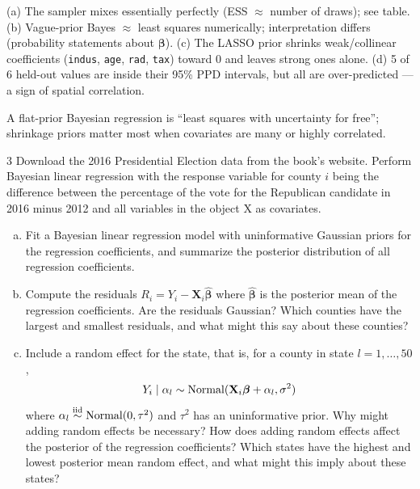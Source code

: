 \documentclass[11pt]{article}
\begin{document}
\begin{answer}
(a) The sampler mixes essentially perfectly (ESS $\approx$ number of draws); see table. (b) Vague-prior Bayes $\approx$ least squares numerically; interpretation differs (probability statements about $\bm\beta$). (c) The LASSO prior shrinks weak/collinear coefficients (\texttt{indus}, \texttt{age}, \texttt{rad}, \texttt{tax}) toward 0 and leaves strong ones alone. (d) 5 of 6 held-out values are inside their 95\% PPD intervals, but all are over-predicted --- a sign of spatial correlation.
\end{answer}

\begin{takeaway}
A flat-prior Bayesian regression is ``least squares with uncertainty for free''; shrinkage priors matter most when covariates are many or highly correlated.
\end{takeaway}


\begin{problem}{3}
Download the 2016 Presidential Election data from the book's website. Perform Bayesian linear regression with the response variable for county $i$ being the difference between the percentage of the vote for the Republican candidate in 2016 minus 2012 and all variables in the object X as covariates.
\begin{enumerate}[(a)]
\item Fit a Bayesian linear regression model with uninformative Gaussian priors for the regression coefficients, and summarize the posterior distribution of all regression coefficients.
\item Compute the residuals $R_i=Y_i-\mathbf X_i\hat{\bm\beta}$ where $\hat{\bm\beta}$ is the posterior mean of the regression coefficients. Are the residuals Gaussian? Which counties have the largest and smallest residuals, and what might this say about these counties?
\item Include a random effect for the state, that is, for a county in state $l=1,\dots,50$,
\[
Y_i\mid\alpha_l\sim\mathrm{Normal}(\mathbf X_i\bm\beta+\alpha_l,\sigma^2)
\]
where $\alpha_l\stackrel{\text{iid}}{\sim}\mathrm{Normal}(0,\tau^2)$ and $\tau^2$ has an uninformative prior. Why might adding random effects be necessary? How does adding random effects affect the posterior of the regression coefficients? Which states have the highest and lowest posterior mean random effect, and what might this imply about these states?
\end{enumerate}
\end{problem}
\end{document}
